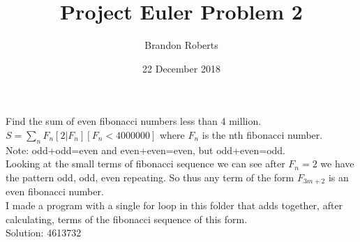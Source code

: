 \documentclass{article}
\begin{document}
\title{Project Euler Problem 2}
\author{Brandon Roberts}
\date{22 December 2018}

\maketitle

Find the sum of even fibonacci numbers less than 4 million.\\
$S=\sum_{n} F_{n}[2|F_{n}][F_{n}<4000000]$ where $F_{n}$ is the nth fibonacci number.\\
Note: odd+odd=even and even+even=even, but odd+even=odd.\\
Looking at the small terms of fibonacci sequence we can see after $F_{n}=2$ we have the pattern odd, odd, even repeating. So thus any term of the form $F_{3m+2}$ is an even fibonacci number.\\
I made a program with a single for loop in this folder that adds together, after calculating, terms of the fibonacci sequence of this form.\\
Solution: 4613732
\end{document}
